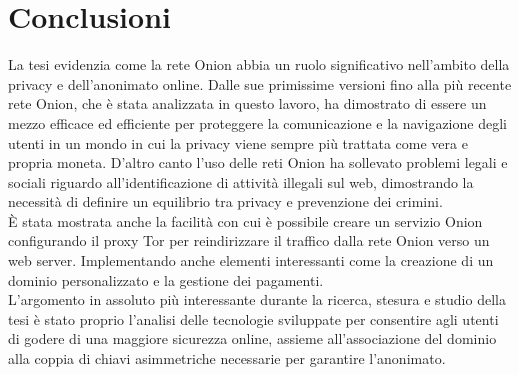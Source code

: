 \chapter{Conclusioni}

La tesi evidenzia come la rete Onion abbia un ruolo significativo nell'ambito della privacy e dell'anonimato online. 
Dalle sue primissime versioni fino alla più recente rete Onion, che è stata analizzata in questo lavoro, ha dimostrato di essere un mezzo efficace ed efficiente per proteggere la comunicazione e la navigazione degli utenti in un mondo in cui la privacy viene sempre più trattata come vera e propria moneta.
D'altro canto l'uso delle reti Onion ha sollevato problemi legali e sociali riguardo all'identificazione di attività illegali sul web, dimostrando la necessità di definire un equilibrio tra privacy e prevenzione dei crimini.
\\

È stata mostrata anche la facilità con cui è possibile creare un servizio Onion configurando il proxy Tor per reindirizzare il traffico dalla rete Onion verso un web server. 
Implementando anche elementi interessanti come la creazione di un dominio personalizzato e la gestione dei pagamenti.
\\

L'argomento in assoluto più interessante durante la ricerca, stesura e studio della tesi è stato proprio l'analisi delle tecnologie sviluppate per consentire agli utenti di godere di una maggiore sicurezza online, assieme all'associazione del dominio alla coppia di chiavi asimmetriche necessarie per garantire l'anonimato. 
